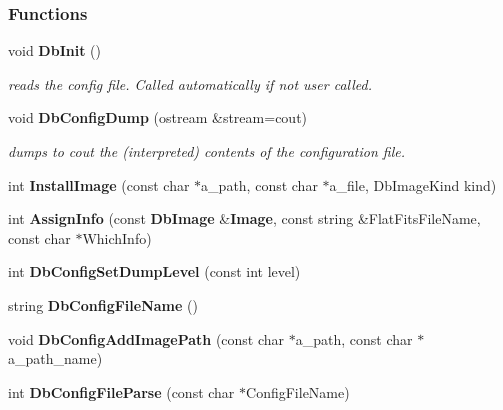 \subsubsection*{Functions}
\begin{CompactItemize}
\item 
void {\bf Db\-Init} ()
\begin{CompactList}\small\item\em reads the config file. Called automatically if not user called.\item\end{CompactList}\item 
void {\bf Db\-Config\-Dump} (ostream \&stream=cout)
\begin{CompactList}\small\item\em dumps to cout the (interpreted) contents of the configuration file.\item\end{CompactList}\item 
{}
int {\bf Install\-Image} (const char $\ast$a\_\-path, const char $\ast$a\_\-file, Db\-Image\-Kind kind)\label{dbimage_h_a16}

\item 
{}
int {\bf Assign\-Info} (const {\bf Db\-Image} \&{\bf Image}, const string \&Flat\-Fits\-File\-Name, const char $\ast$Which\-Info)\label{dbimage_h_a17}

\item 
{}
int {\bf Db\-Config\-Set\-Dump\-Level} (const int level)\label{dbimage_h_a18}

\item 
{}
string {\bf Db\-Config\-File\-Name} ()\label{dbimage_h_a19}

\item 
{}
void {\bf Db\-Config\-Add\-Image\-Path} (const char $\ast$a\_\-path, const char $\ast$a\_\-path\_\-name)\label{dbimage_h_a20}

\item 
{}
int {\bf Db\-Config\-File\-Parse} (const char $\ast$Config\-File\-Name)\label{dbimage_h_a21}

\end{CompactItemize}


